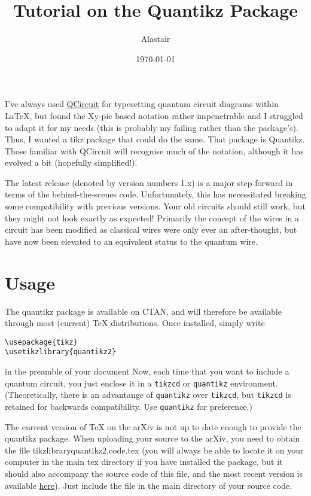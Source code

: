 \documentclass[aps,pra,10pt,nofootinbib]{revtex4-2}
\begin{document}
\title{Tutorial on the Quantikz Package}
\date{\today}
\author{Alastair }
\begin{abstract}
\end{abstract}
\maketitle
I've always used \href{https://arxiv.org/abs/quant-ph/0406003}{QCircuit} for typesetting quantum circuit diagrams within \LaTeX, but found the Xy-pic based notation rather impenetrable and I struggled to adapt it for my needs (this is probably my failing rather than the package's). Thus, I wanted a tikz package that could do the same. That package is Quantikz. Those familiar with QCircuit will recognise much of the notation, although it has evolved a bit (hopefully simplified!).

The latest release (denoted by version numbers 1.x) is a major step forward in terms of the behind-the-scenes code. Unfortunately, this has necessitated breaking some compatibility with previous versions. Your old circuits should still work, but they might not look exactly as expected! Primarily the concept of the wires in a circuit has been modified as classical wires were only ever an after-thought, but have now been elevated to an equivalent status to the quantum wire.

\tableofcontents

\section{Usage}

The quantikz package is available on CTAN, and will therefore be available through most (current) TeX distributions. Once installed, simply write
\begin{verbatim}
\usepackage{tikz}
\usetikzlibrary{quantikz2}
\end{verbatim}
in the preamble of your document
Now, each time that you want to include a quantum circuit, you just enclose it in a \verb!tikzcd! or \verb!quantikz! environment. (Theoretically, there is an advantange of \verb!quantikz! over \verb!tikzcd!, but \verb!tikzcd! is retained for backwards compatibility. Use \verb!quantikz! for preference.)

The current version of TeX on the arXiv is not up to date enough to provide the quantikz package. When uploading your source to the arXiv, you need to obtain the file tikzlibraryquantikz2.code.tex (you will always be able to locate it on your computer in the main tex directory if you have installed the package, but it should also accompany the source code of this file, and the most recent version is available \href{http://dx.doi.org/10.17637/rh.7000520}{here}). Just include the file in the main directory of your source code.
\end{document}
